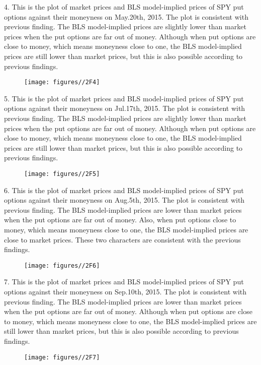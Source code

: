 \documentclass{report}
\begin{document}
4. This is the plot of market prices and BLS model-implied prices of SPY put options against their moneyness on May.20th, 2015. The plot is consistent with previous finding. The BLS model-implied prices are slightly lower than market prices when the put options are far out of money. Although when put options are close to money, which means moneyness close to one, the BLS model-implied prices are still lower than market prices, but this is also possible according to previous findings.
\begin{figure}[H]
        \centering 
         \texttt{[image: figures//2F4]}
\end{figure}

5. This is the plot of market prices and BLS model-implied prices of SPY put options against their moneyness on Jul.17th, 2015. The plot is consistent with previous finding. The BLS model-implied prices are slightly lower than market prices when the put options are far out of money. Although when put options are close to money, which means moneyness close to one, the BLS model-implied prices are still lower than market prices, but this is also possible according to previous findings.
\begin{figure}[H]
        \centering 
         \texttt{[image: figures//2F5]}
\end{figure}

6. This is the plot of market prices and BLS model-implied prices of SPY put options against their moneyness on Aug.5th, 2015. The plot is consistent with previous finding. The BLS model-implied prices are lower than market prices when the put options are far out of money. Also, when put options close to money, which means moneyness close to one, the BLS model-implied prices are close to market prices. These two characters are consistent with the previous findings.
\begin{figure}[H]
        \centering 
         \texttt{[image: figures//2F6]}
\end{figure}

7. This is the plot of market prices and BLS model-implied prices of SPY put options against their moneyness on Sep.10th, 2015. The plot is consistent with previous finding. The BLS model-implied prices are lower than market prices when the put options are far out of money. Although when put options are close to money, which means moneyness close to one, the BLS model-implied prices are still lower than market prices, but this is also possible according to previous findings.
\begin{figure}[H]
        \centering 
         \texttt{[image: figures//2F7]}
\end{figure}
\end{document}
